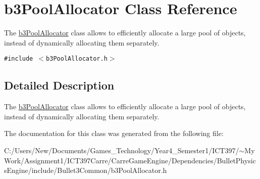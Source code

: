 \hypertarget{classb3_pool_allocator}{
\section{b3PoolAllocator Class Reference}
\label{classb3_pool_allocator}
}
The \hyperlink{classb3_pool_allocator}{b3PoolAllocator} class allows to efficiently allocate a large pool of objects, instead of dynamically allocating them separately.  


{\tt \#include $<$b3PoolAllocator.h$>$}



\subsection{Detailed Description}
The \hyperlink{classb3_pool_allocator}{b3PoolAllocator} class allows to efficiently allocate a large pool of objects, instead of dynamically allocating them separately. 

The documentation for this class was generated from the following file:\begin{CompactItemize}
\item 
C:/Users/New/Documents/Games\_\-Technology/Year4\_\-Semester1/ICT397/$\sim$My Work/Assignment1/ICT397Carre/CarreGameEngine/Dependencies/BulletPhysicsEngine/include/Bullet3Common/b3PoolAllocator.h\end{CompactItemize}
